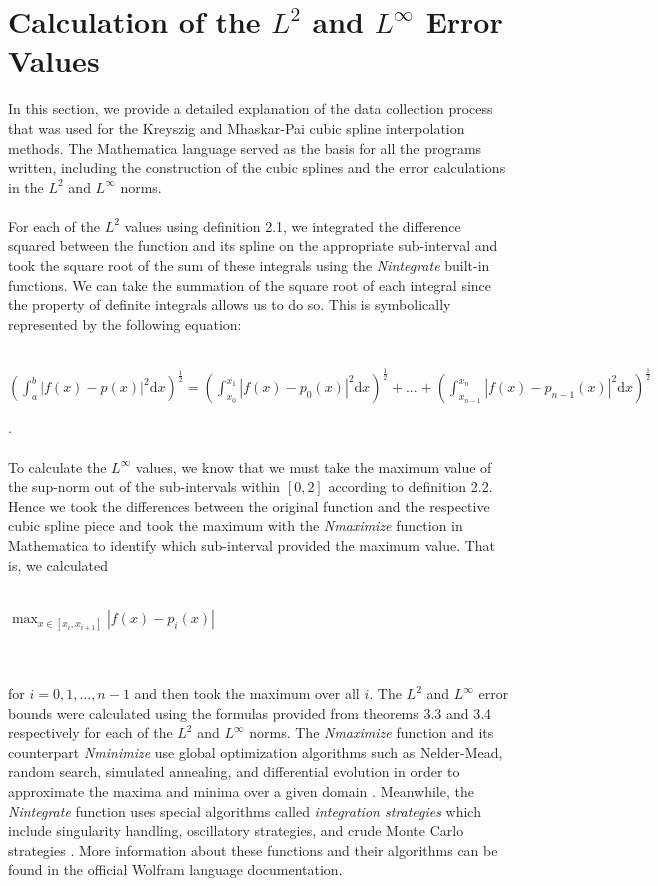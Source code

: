 \section{Calculation of the $L^2$ and $L^{\infty}$ Error Values}
In this section, we provide a detailed explanation of the data collection process that was used for the Kreyszig and Mhaskar-Pai cubic spline interpolation methods. The Mathematica language served as the basis for all the programs written, including the construction of the cubic splines and the error calculations in the $L^2$ and $L^{\infty}$ norms.
\\\\
For each of the $L^2$ values using definition 2.1, we integrated the difference squared between the function and its spline on the appropriate sub-interval and took the square root of the sum of these integrals using the \emph{Nintegrate} built-in functions. We can take the summation of the square root of each integral since the property of definite integrals allows us to do so. This is symbolically represented by the following equation: \\\\
\centerline{$\displaystyle{\left(\int_{a}^{b} |f(x)-p(x)|^2 \mathrm{d}x\right)^\frac{1}{2} = \left(\int_{x_{0}}^{x_{1}} |f(x)-p_{0}(x)|^2 \mathrm{d}x \right)^\frac{1}{2} + ... + \left(\int_{x_{n-1}}^{x_{n}} |f(x)-p_{n-1}(x)|^2 \mathrm{d}x\right)^\frac{1}{2}}$}.\\\\
To calculate the $L^{\infty}$ values, we know that we must take the maximum value of the sup-norm out of the sub-intervals within $[0,2]$ according to definition 2.2. Hence we took the differences between the original function and the respective cubic spline piece and took the maximum with the \emph{Nmaximize} function in Mathematica to identify which sub-interval provided the maximum value. That is, we calculated \\\\
\centerline{$\displaystyle{\max_{x \in [x_{i}, x_{i+1}]}|f(x)-p_{i}(x)|}$}\\\\
 for $i = 0,1,...,n-1$ and then took the maximum over all $i$. The $L^2$ and $L^{\infty}$ error bounds were calculated using the formulas provided from theorems 3.3 and 3.4 respectively for each of the $L^2$ and $L^{\infty}$ norms. The \emph{Nmaximize} function and its counterpart \emph{Nminimize} use global optimization algorithms such as Nelder-Mead, random search, simulated annealing, and differential evolution in order to approximate the maxima and minima over a given domain \cite{key10}. Meanwhile, the \emph{Nintegrate} function uses special algorithms called \emph{integration strategies} which include singularity handling, oscillatory strategies, and crude Monte Carlo strategies \cite{key11}. More information about these functions and their algorithms can be found in the official Wolfram language documentation.

